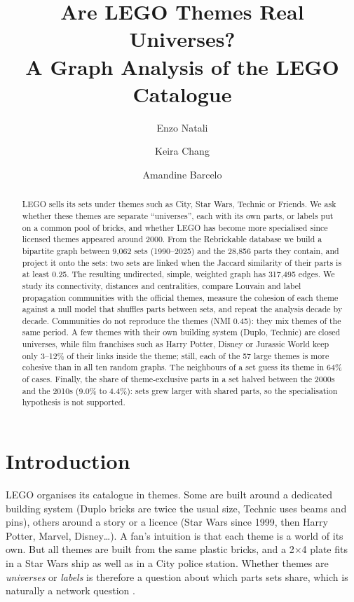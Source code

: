 \documentclass[10pt,a4paper]{article}
\title{Are LEGO Themes Real Universes?\\A Graph Analysis of the LEGO Catalogue}
\author{
  Enzo Natali
  \and
  Keira Chang
  \and
  Amandine Barcelo
}
\date{}
\begin{document}
\maketitle

\begin{abstract}
LEGO sells its sets under themes such as City, Star Wars, Technic or Friends.
We ask whether these themes are separate ``universes'', each with its own
parts, or labels put on a common pool of bricks, and whether LEGO has become
more specialised since licensed themes appeared around 2000. From the
Rebrickable database we build a bipartite graph between 9,062 sets (1990--2025)
and the 28,856 parts they contain, and project it onto the sets: two sets are
linked when the Jaccard similarity of their parts is at least 0.25. The
resulting undirected, simple, weighted graph has 317,495 edges. We study its
connectivity, distances and centralities, compare Louvain and label
propagation communities with the official themes, measure the cohesion of each
theme against a null model that shuffles parts between sets, and repeat the
analysis decade by decade. Communities do not reproduce the themes (NMI 0.45):
they mix themes of the same period. A few themes with their own building
system (Duplo, Technic) are closed universes, while film franchises such as
Harry Potter, Disney or Jurassic World keep only 3--12\% of their links inside
the theme; still, each of the 57 large themes is more cohesive than in all ten
random graphs. The neighbours of a set guess its theme in 64\% of cases. Finally, the share of theme-exclusive parts in a set halved
between the 2000s and the 2010s (9.0\% to 4.4\%): sets grew larger with
shared parts, so the specialisation hypothesis is not supported.
\end{abstract}

\section{Introduction}

LEGO organises its catalogue in themes. Some are built around a dedicated
building system (Duplo bricks are twice the usual size, Technic uses beams and
pins), others around a story or a licence (Star Wars since 1999, then Harry
Potter, Marvel, Disney\ldots). A fan's intuition is that each theme is a world
of its own. But all themes are built from the same plastic bricks, and a 2$\times$4
plate fits in a Star Wars ship as well as in a City police station. Whether
themes are \emph{universes} or \emph{labels} is therefore a question about
which parts sets share, which is naturally a network question
\cite{newman2003}.
\end{document}
